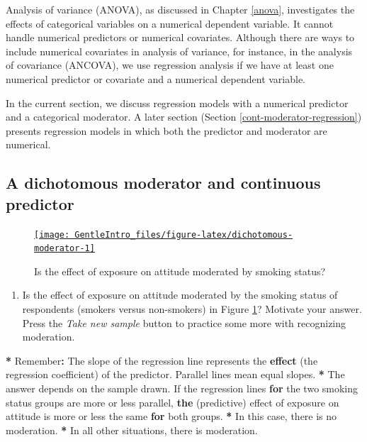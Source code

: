 \documentclass[a4paper]{book}
\newenvironment{Shaded}{\begin{snugshade}}{\end{snugshade}}
\newcommand{\KeywordTok}[1]{\textcolor[rgb]{0,0,0}{\textbf{#1}}}
\newcommand{\StringTok}[1]{\textcolor[rgb]{0.00,0.00,0.00}{#1}}
\newcommand{\ControlFlowTok}[1]{\textcolor[rgb]{0.00,0.00,0.00}{\textbf{#1}}}
\newcommand{\OperatorTok}[1]{\textcolor[rgb]{0.00,0.00,0.00}{\textbf{#1}}}
\newcommand{\NormalTok}[1]{#1}
\providecommand{\tightlist}{%
  \setlength{\itemsep}{0pt}\setlength{\parskip}{0pt}}
\theoremstyle{definition}
\theoremstyle{definition}
\theoremstyle{definition}
\theoremstyle{remark}
\begin{document}
Analysis of variance (ANOVA), as discussed in Chapter \ref{anova},
investigates the effects of categorical variables on a numerical
dependent variable. It cannot handle numerical predictors or numerical
covariates. Although there are ways to include numerical covariates in
analysis of variance, for instance, in the analysis of covariance
(ANCOVA), we use regression analysis if we have at least one numerical
predictor or covariate and a numerical dependent variable.

In the current section, we discuss regression models with a numerical
predictor and a categorical moderator. A later section (Section
\ref{cont-moderator-regression}) presents regression models in which
both the predictor and moderator are numerical.

\subsection{A dichotomous moderator and continuous
predictor}\label{a-dichotomous-moderator-and-continuous-predictor}

\begin{figure}[H]
\href{http://82.196.4.233:3838/apps/dichotomous-moderator/}{\texttt{[image: GentleIntro\_files/figure-latex/dichotomous-moderator-1]} }\caption{Is the effect of exposure on attitude moderated by smoking status?}\label{fig:dichotomous-moderator}
\end{figure}

\begin{enumerate}
\def\labelenumi{\arabic{enumi}.}
\tightlist
\item
  Is the effect of exposure on attitude moderated by the smoking status
  of respondents (smokers versus non-smokers) in Figure
  \ref{fig:dichotomous-moderator}? Motivate your answer. Press the
  \emph{Take new sample} button to practice some more with recognizing
  moderation.
\end{enumerate}

\begin{Shaded}
\begin{Highlighting}[]
\OperatorTok{*}\StringTok{ }\NormalTok{Remember}\OperatorTok{:}\StringTok{ }\NormalTok{The slope of the regression line represents the }\KeywordTok{effect}\NormalTok{ (the}
\NormalTok{regression coefficient) of the predictor. Parallel lines mean equal slopes.}
\OperatorTok{*}\StringTok{ }\NormalTok{The answer depends on the sample drawn. If the regression lines }\ControlFlowTok{for}\NormalTok{ the two}
\NormalTok{smoking status groups are more or less parallel, }\KeywordTok{the}\NormalTok{ (predictive) effect of}
\NormalTok{exposure on attitude is more or less the same }\ControlFlowTok{for}\NormalTok{ both groups.}
\OperatorTok{*}\StringTok{ }\NormalTok{In this case, there is no moderation.}
\OperatorTok{*}\StringTok{ }\NormalTok{In all other situations, there is moderation.}
\end{Highlighting}
\end{Shaded}
\end{document}
